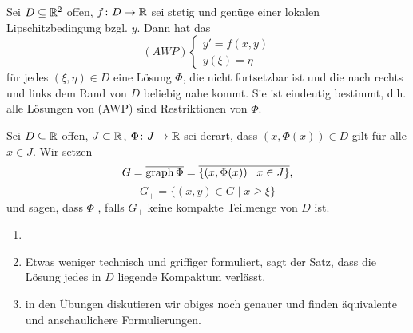 \begin{satz}
	Sei $ D\subseteq\mathbb{R}^2 $ offen, $ f\colon D\rightarrow\mathbb{R} $ sei stetig und gen\"uge einer lokalen Lipschitzbedingung bzgl. $ y $. Dann hat das
	\[ (AWP)\begin{cases}
	y'=f(x,y)\\y(\xi)=\eta
	\end{cases} \]
	f\"ur jedes $ (\xi,\eta)\in D $ eine L\"osung $ \Phi $, die nicht fortsetzbar ist und die nach rechts und links dem Rand von $ D $ beliebig nahe kommt. Sie ist eindeutig bestimmt, d.h. alle L\"osungen von (AWP) sind Restriktionen von $ \Phi $. 
\end{satz}
\begin{definition}
	Sei $ D\subseteq\mathbb{R} $ offen, $ J\subset\mathbb{R} $, $ \Phi\colon J\rightarrow\mathbb{R} $ sei derart, dass $ (x,\Phi(x))\in D $ gilt f\"ur alle $ x\in J $. Wir setzen
	\[ G=\overline{\operatorname{graph}\Phi}=\overline{\lbrace (x,\Phi(x))\mid x\in J\rbrace}, \]  
	\[ G_+=\lbrace(x,y)\in G\mid x\geq\xi\rbrace \]
	und sagen, dass $ \Phi $ , falls $ G_+ $ keine kompakte Teilmenge von $ D $ ist.
\end{definition}
\begin{bemerkung}
	\begin{enumerate}
		\item[]
		\item Etwas weniger technisch und griffiger formuliert, sagt der Satz, dass die L\"osung jedes in $ D $ liegende Kompaktum verl\"asst. 
		\item in den \"Ubungen diskutieren wir obiges noch genauer und finden \"aquivalente und anschaulichere Formulierungen. 
	\end{enumerate}
\end{bemerkung}

